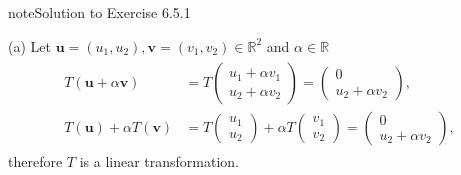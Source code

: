 \documentclass[letterpaper,10pt,english]{jupyterBook}
\begin{document}
\begin{sphinxadmonition}{note}{Solution to Exercise 6.5.1}



\sphinxAtStartPar
(a) Let \(\mathbf{u} = (u_1, u_2), \mathbf{v} = (v_1, v_2) \in \mathbb{R}^2\) and \(\alpha \in \mathbb{R}\)
\begin{equation*}
\begin{split} \begin{align*}
    T(\mathbf{u} + \alpha \mathbf{v}) 
    &= T\begin{pmatrix} u_1 + \alpha v_1 \\ u_2 + \alpha v_2 \end{pmatrix} 
    = \begin{pmatrix} 0 \\ u_2 + \alpha v_2 \end{pmatrix}, \\
    T(\mathbf{u}) + \alpha T(\mathbf{v})
    &= T\begin{pmatrix} u_1 \\ u_2 \end{pmatrix} + \alpha T \begin{pmatrix} v_1 \\ v_2 \end{pmatrix}
    = \begin{pmatrix} 0 \\ u_2 + \alpha v_2 \end{pmatrix},
\end{align*} \end{split}
\end{equation*}
\sphinxAtStartPar
therefore \(T\) is a linear transformation.


\end{sphinxadmonition}
\end{document}
